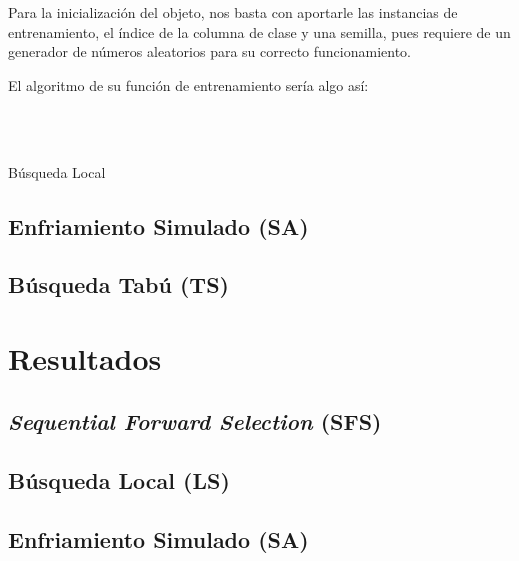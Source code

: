 \documentclass[a4paper, 11pt]{article}
\begin{document}
			Para la inicialización del objeto, nos basta con aportarle las instancias de entrenamiento,
			el índice de la columna de clase y una semilla, pues requiere de un generador de números
			aleatorios para su correcto funcionamiento.

			El algoritmo de su función de entrenamiento sería algo así:
			
			\begin{algorithm}[H]
				\begin{algorithmic}[1]
					\REQUIRE \ \\
							 \

					
					\ENDWHILE
				\end{algorithmic}
			\caption{Búsqueda Local}
			\label{LS}
			\end{algorithm}			
		
		\subsection{Enfriamiento Simulado (\textbf{SA})}

		\subsection{Búsqueda Tabú (\textbf{TS})}

			
	\section{Resultados}
		\subsection{\textit{Sequential Forward Selection} (\textbf{SFS})}
			
			
			
		
		\subsection{Búsqueda Local (\textbf{LS})}
			
			
			

		\subsection{Enfriamiento Simulado (\textbf{SA})}
			
			
			
		
\end{document}
